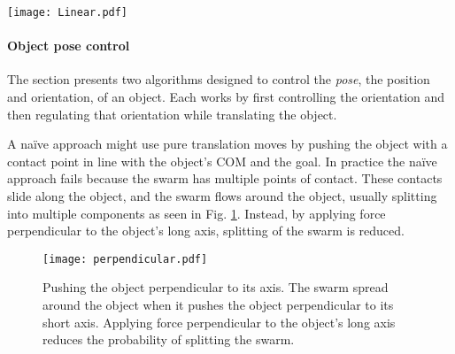 \begin{figure*}
\centering

\texttt{[image: Linear.pdf]}
\vspace{0em}
\caption{\label{fig:LinearScreenShots}
Screenshots from simulation of line following with perpendicular orientation.
 The object's COM is pushed to the line, while its orientation is regulated to be perpendicular to the line.
}
\end{figure*}








\paragraph{Object pose control}
The section presents two algorithms designed to control the \emph{pose}, the position and orientation, of an object.  
Each works by first controlling the orientation and then regulating that orientation while translating the object. 

A na\"{i}ve approach might use pure translation moves by  pushing  the object with a contact point in line with the object's COM and the goal.
In practice the na\"{i}ve approach fails because the swarm has multiple points of contact. These contacts slide along the object, and the swarm flows around the object, usually splitting into multiple components as seen in Fig. \ref{fig:perpendicular}.
Instead, by applying force perpendicular to the object's long axis, splitting of the swarm is reduced. 

\begin{figure}
\begin{center}
	\texttt{[image: perpendicular.pdf]}
\end{center}
\vspace{-1em}
\caption{\label{fig:perpendicular} 
Pushing the object perpendicular to its axis. The swarm spread around the object when it pushes the object perpendicular to its short axis. Applying force perpendicular to the object's long axis reduces the probability of splitting the swarm.
}
\vspace{-1em}
\end{figure}

